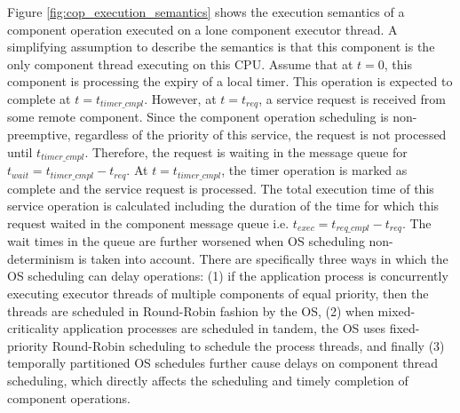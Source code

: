 Figure \ref{fig:cop_execution_semantics} shows the execution semantics of a component operation executed on a lone component executor thread. A simplifying assumption  to describe the semantics is that this component is the only component thread executing on this CPU. Assume that at $t=0$, this component is processing the expiry of a local timer. This operation is expected to complete at $t = t_{timer\_cmpl}$. However, at $t = t_{req}$, a service request is received from some remote component. Since the component operation scheduling is non-preemptive, regardless of the priority of this service, the request is not processed until $t_{timer\_cmpl}$. Therefore, the request is waiting in the message queue for $t_{wait} = t_{timer\_cmpl} - t_{req}$. At $t = t_{timer\_cmpl}$, the timer operation is marked as complete and the service request is processed. The total execution time of this service operation is calculated including the duration of the time for which this request waited in the component message queue i.e. $t_{exec} = t_{req\_cmpl} - t_{req}$. The wait times in the queue are further worsened when OS scheduling non-determinism is taken into account. There are specifically three ways in which the OS scheduling can delay operations: (1) if the application process is concurrently executing executor threads of multiple components of equal priority, then the threads are scheduled in Round-Robin fashion by the OS, (2) when mixed-criticality application processes are scheduled in tandem, the OS uses fixed-priority Round-Robin scheduling to schedule the process threads, and finally (3) temporally partitioned OS schedules further cause delays on component thread scheduling, which directly affects the scheduling and timely completion of component operations. 
